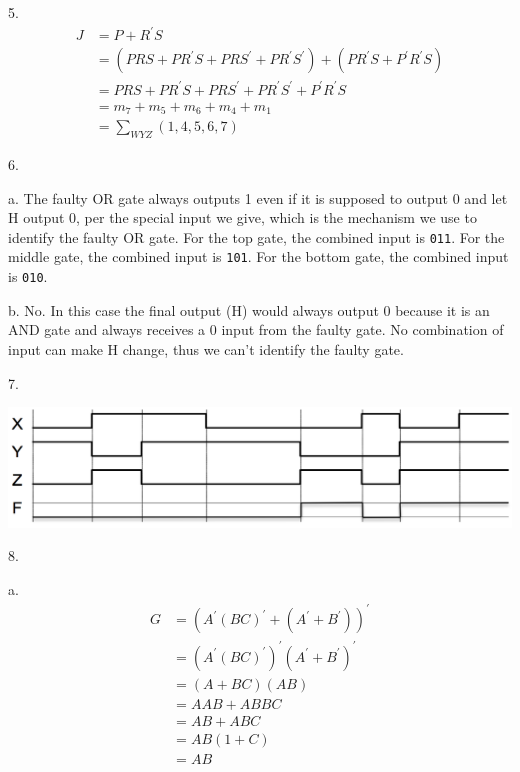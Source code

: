 \documentclass[UTF8,12pt,letterpaper,oneside]{amsart}
\begin{document}
5. \begin{equation*}\begin{split}
J &= P + R^\prime S\\
  &= (PRS + PR^\prime S + PRS^\prime + PR^\prime S^\prime) + (PR^\prime S + P^\prime R^\prime S)\\
  &= PRS + PR^\prime S + PRS^\prime + PR^\prime S^\prime + P^\prime R^\prime S\\
  &= m_7 + m_5 + m_6 + m_4 + m_1\\
  &= \sum_{WYZ}(1, 4, 5, 6, 7)
\end{split}\end{equation*}

6.

a. The faulty OR gate always outputs 1 even if it is supposed to output 0 and let H output 0, per the special input we give, which is the mechanism we use to identify the faulty OR gate. For the top gate, the combined input is \texttt{011}. For the middle gate, the combined input is \texttt{101}. For the bottom gate, the combined input is \texttt{010}.

b. No. In this case the final output (H) would always output 0 because it is an AND gate and always receives a 0 input from the faulty gate. No combination of input can make H change, thus we can't identify the faulty gate.

7.

\includegraphics[scale=0.35]{hw2waveform.png}

8.

a. \begin{equation*}\begin{split}
G &= (A^\prime(BC)^\prime + (A^\prime + B^\prime))^\prime\\
  &= (A^\prime(BC)^\prime)^\prime (A^\prime + B^\prime)^\prime\\
  &= (A + BC)(AB)\\
  &= AAB + ABBC\\
  &= AB + ABC\\
  &= AB(1 + C)\\
  &= AB
\end{split}\end{equation*}
\end{document}
